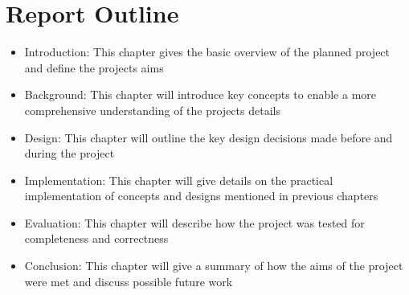 \section{Report Outline}
\begin{itemize}
    \item Introduction: This chapter gives the basic overview of the planned project and define the projects aims
    \item Background: This chapter will introduce key concepts to enable a more comprehensive understanding of the projects details
    \item Design: This chapter will outline the key design decisions made before and during the project
    \item Implementation: This chapter will give details on the practical implementation of concepts and designs mentioned in previous chapters
    \item Evaluation: This chapter will describe how the project was tested for completeness and correctness
    \item Conclusion: This chapter will give a summary of how the aims of the project were met and discuss possible future work
\end{itemize}

